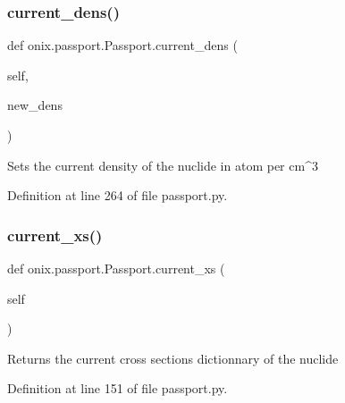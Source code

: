 \subsubsection{\texorpdfstring{current\+\_\+dens()}{current\_dens()}\hspace{0.1cm}{\footnotesize\ttfamily [2/2]}}
{\footnotesize\ttfamily def onix.\+passport.\+Passport.\+current\+\_\+dens (\begin{DoxyParamCaption}\item[{}]{self,  }\item[{}]{new\+\_\+dens }\end{DoxyParamCaption})}

\begin{DoxyVerb}Sets the current density of the nuclide in atom per cm^3\end{DoxyVerb}
 

Definition at line 264 of file passport.\+py.

\mbox{\label{classonix_1_1passport_1_1Passport_ab7350ba0c953a0d2c8482abe3943993e}} 
\subsubsection{\texorpdfstring{current\+\_\+xs()}{current\_xs()}\hspace{0.1cm}{\footnotesize\ttfamily [1/2]}}
{\footnotesize\ttfamily def onix.\+passport.\+Passport.\+current\+\_\+xs (\begin{DoxyParamCaption}\item[{}]{self }\end{DoxyParamCaption})}

\begin{DoxyVerb}Returns the current cross sections dictionnary of the nuclide\end{DoxyVerb}
 

Definition at line 151 of file passport.\+py.

\mbox{\label{classonix_1_1passport_1_1Passport_aa44c60d6e0535a89733418cb5ca476b9}} 
